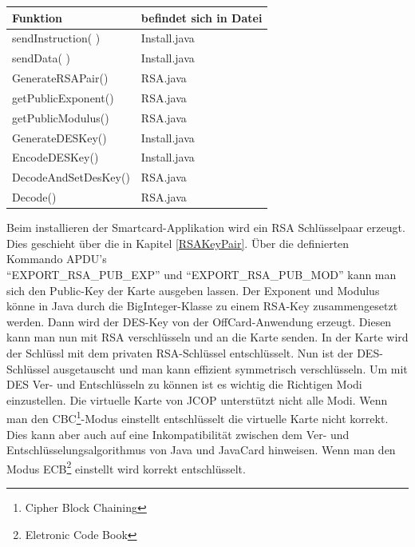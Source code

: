 \documentclass[parskip]{scrartcl}
\begin{document}
\begin{tabular}{|l|l|}
\hline Funktion & befindet sich in Datei \\ 
\hline
\hline sendInstruction( ) & Install.java \\ 
\hline sendData( ) & Install.java \\ 
\hline GenerateRSAPair()  & RSA.java \\ 
\hline getPublicExponent() & RSA.java \\ 
\hline getPublicModulus() & RSA.java \\ 
\hline GenerateDESKey() & Install.java \\ 
\hline EncodeDESKey() & Install.java \\
\hline DecodeAndSetDesKey() & RSA.java \\
\hline Decode() & RSA.java \\
\hline 
\end{tabular} 

Beim installieren der Smartcard-Applikation wird ein RSA Schlüsselpaar erzeugt. Dies geschieht über die in Kapitel \ref{RSAKeyPair}. Über die definierten Kommando APDU's \\\enquote{EXPORT\_RSA\_PUB\_EXP} und \enquote{EXPORT\_RSA\_PUB\_MOD} kann man sich den Public-Key der Karte ausgeben lassen. Der Exponent und Modulus könne in Java durch die BigInteger-Klasse zu einem RSA-Key zusammengesetzt werden. Dann wird der DES-Key von der OffCard-Anwendung erzeugt. Diesen kann man nun mit RSA verschlüsseln und an die Karte senden. In der Karte wird der Schlüssl mit dem privaten RSA-Schlüssel entschlüsselt. Nun ist der DES-Schlüssel ausgetauscht und man kann effizient symmetrisch verschlüsseln. Um mit DES Ver- und Entschlüsseln zu können ist es wichtig die Richtigen Modi einzustellen. Die virtuelle Karte von JCOP unterstützt nicht alle Modi. Wenn man den CBC\footnote{Cipher Block Chaining}-Modus einstellt entschlüsselt die virtuelle Karte nicht korrekt. Dies kann aber auch auf eine Inkompatibilität zwischen dem Ver- und Entschlüsselungsalgorithmus von Java und JavaCard hinweisen. Wenn man den Modus ECB\footnote{Eletronic Code Book} einstellt wird korrekt entschlüsselt. 
\end{document}
